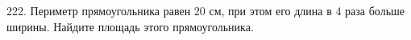 222. Периметр прямоугольника равен 20 см, при этом его длина в 4 раза больше ширины. Найдите площадь этого прямоугольника.\\
